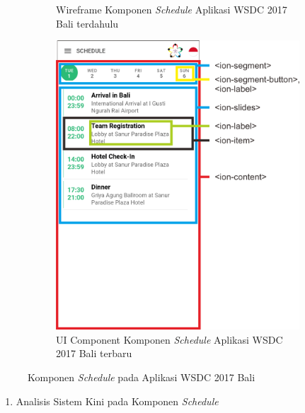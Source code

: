 \begin{enumerate}
\begin{figure}[H]
\begin{subfigure}[b]{0.43\textwidth}
         	\caption{Wireframe Komponen \textit{Schedule} Aplikasi WSDC 2017 Bali terdahulu}
         	\label{fig:SchedulePageWireframe}
     	\end{subfigure}
     	\hspace*{0.5in}
     	\begin{subfigure}[b]{0.43\textwidth}
         	\centering
         	\includegraphics[scale=0.4]{Gambar/SchedulePageKini.png}
         	\caption{UI Component Komponen \textit{Schedule} Aplikasi WSDC 2017 Bali terbaru}
         	\label{fig:SchedulePageKini}
     	\end{subfigure}
        \caption{Komponen \textit{Schedule} pada Aplikasi WSDC 2017 Bali}
        \label{fig:UIComponent1}
	\end{figure}
	\begin{enumerate}
		\item Analisis Sistem Kini pada Komponen \textit{Schedule} \\

\end{enumerate}
\end{enumerate}
